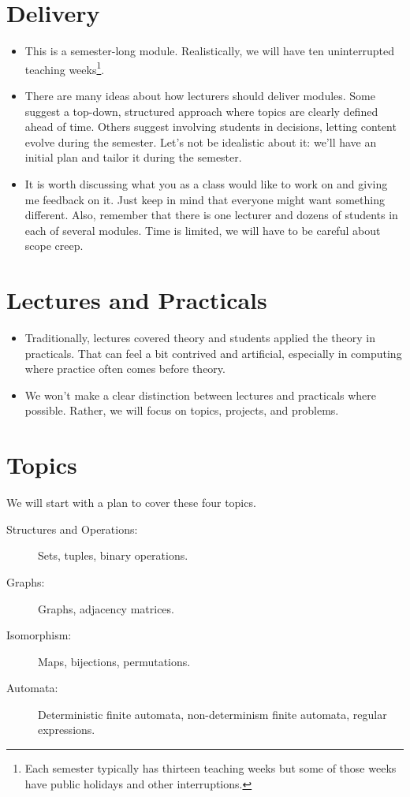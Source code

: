 \documentclass{iansnotes}
\begin{document}
\section{Delivery}
\begin{itemize}
  \item This is a semester-long module. Realistically, we will have ten uninterrupted teaching weeks\footnote{Each semester typically has thirteen teaching weeks but some of those weeks have public holidays and other interruptions.}.
  \item There are many ideas about how lecturers should deliver modules. Some suggest a top-down, structured approach where topics are clearly defined ahead of time. Others suggest involving students in decisions, letting content evolve during the semester. Let's not be idealistic about it: we'll have an initial plan and tailor it during the semester.
  \item It is worth discussing what you as a class would like to work on and giving me feedback on it. Just keep in mind that everyone might want something different. Also, remember that there is one lecturer and dozens of students in each of several modules. Time is limited, we will have to be careful about scope creep.
\end{itemize}

 
\section{Lectures and Practicals}
\begin{itemize}
  \item Traditionally, lectures covered theory and students applied the theory in practicals. That can feel a bit contrived and artificial, especially in computing where practice often comes before theory.
  \item We won't make a clear distinction between lectures and practicals where possible. Rather, we will focus on topics, projects, and problems.
\end{itemize}


\section{Topics}
We will start with a plan to cover these four topics.

\begin{description}
  \item[Structures and Operations:] Sets, tuples, binary operations.
  \item[Graphs:] Graphs, adjacency matrices.
  \item[Isomorphism:] Maps, bijections, permutations.
  \item[Automata:] Deterministic finite automata, non-determinism finite automata, regular expressions.
\end{description}
\end{document}
